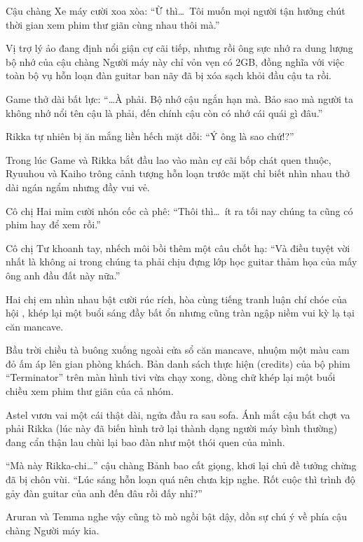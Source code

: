 \documentclass[../main.tex]{subfiles}
\begin{document}
Cậu chàng Xe máy cười xoa xòa: ``Ừ thì\dots\ Tôi muốn mọi người tận hưởng chút thời gian xem phim thư giãn cùng nhau thôi mà.''

Vị trợ lý ảo đang định nổi giận cự cãi tiếp, nhưng rồi ông sực nhớ ra dung lượng bộ nhớ của cậu chàng Người máy này chỉ vỏn vẹn có 2GB, đồng nghĩa với việc toàn bộ vụ hỗn loạn đàn guitar ban nãy đã bị xóa sạch khỏi đầu cậu ta rồi.

Game thở dài bất lực: ``\dots À phải. Bộ nhớ cậu ngắn hạn mà. Bảo sao mà người ta không nhớ nổi tên cậu là phải, đến chính cậu còn có nhớ cái quái gì đâu.''

Rikka tự nhiên bị ăn mắng liền hếch mặt dỗi: ``Ý ông là sao chứ!?''

Trong lúc Game và Rikka bắt đầu lao vào màn cự cãi bốp chát quen thuộc, Ryuuhou và Kaiho trông cảnh tượng hỗn loạn trước mặt chỉ biết nhìn nhau thở dài ngán ngẩm nhưng đầy vui vẻ.

Cô chị Hai mỉm cười nhón cốc cà phê: ``Thôi thì\dots\ ít ra tối nay chúng ta cũng có phim hay để xem rồi.''

Cô chị Tư khoanh tay, nhếch môi bồi thêm một câu chốt hạ: ``Và điều tuyệt vời nhất là không ai trong chúng ta phải chịu đựng lớp học guitar thảm họa của mấy ông anh đầu đất này nữa.''

Hai chị em nhìn nhau bật cười rúc rích, hòa cùng tiếng tranh luận chí chóe của hội \hls, khép lại một buổi sáng đầy bất ổn nhưng cũng tràn ngập niềm vui kỳ lạ tại căn mancave.

\omk

Bầu trời chiều tà buông xuống ngoài cửa sổ căn mancave, nhuộm một màu cam đỏ ấm áp lên gian phòng khách. Bản danh sách thực hiện (credits) của bộ phim ``Terminator'' trên màn hình tivi vừa chạy xong, dòng chữ khép lại một buổi chiều xem phim thư giãn của cả nhóm.

Astel vươn vai một cái thật dài, ngửa đầu ra sau sofa. Ánh mắt cậu bất chợt va phải Rikka (lúc này đã biến hình trở lại thành dạng người máy bình thường) đang cẩn thận lau chùi lại bao đàn như một thói quen của mình.

``Mà này Rikka-chi\dots'' cậu chàng Bảnh bao cất giọng, khơi lại chủ đề tưởng chừng đã bị chôn vùi. ``Lúc sáng hỗn loạn quá nên chưa kịp nghe. Rốt cuộc thì trình độ gảy đàn guitar của anh đến đâu rồi đấy nhỉ?''

Aruran và Temma nghe vậy cũng tò mò ngồi bật dậy, dồn sự chú ý về phía cậu chàng Người máy kia.
\end{document}
